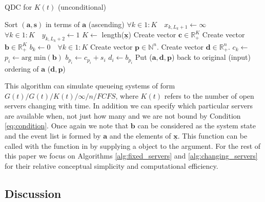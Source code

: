 \documentclass[article]{jss}
\begin{document}
\begin{algorithm}[ht!]
\caption{QDC for $K(t)$ (unconditional)}
\label{alg:changing_servers_unconditional} 
\begin{algorithmic}[1]
\State Sort $(\mathbf{a}, \mathbf{s})$ in terms of $\mathbf{a}$ (ascending)
\State $\forall k \in 1:K \quad x_{k,L_k+1} \leftarrow \infty$
\State $\forall k \in 1:K \quad y_{k,L_k+2} \leftarrow 1$
\State $K \leftarrow $ length($\mathbf{\underline{x}}$)
\State Create vector $\mathbf{c} \in \mathbb{R}_{\text{+}}^{K}$
\State Create vector $\mathbf{b} \in \mathbb{R}_{\text{+}}^{K}$
\State $b_k \leftarrow 0 \quad \forall k \in 1:K$
\State Create vector $\mathbf{p} \in \mathbb{N}^{n}$.
\State Create vector $\mathbf{d} \in \mathbb{R}_{+}^{n}$.
        \State $c_k \leftarrow$ 
    \EndFor
\State $p_i \leftarrow \text{arg min}(\mathbf{b}) $
\State $b_{p_i} \leftarrow c_{p_i} + s_i $
\State $d_i \leftarrow b_{p_i}$ 
\EndFor 
\State Put ($\mathbf{a}, \mathbf{d}, \mathbf{p}$) back to original (input) ordering of $\mathbf{a}$ 
\State \Return ($\mathbf{d}, \mathbf{p}$)
\EndFunction
\end{algorithmic}
\end{algorithm}

This algorithm can simulate queueing systems of form $G(t)/G(t)/K(t)/\infty/n/FCFS$, where $K(t)$ refers to the number of open servers changing with time. In addition we can specify which particular servers are available when, not just how many and we are not bound by Condition \ref{eq:condition}. Once again we note that $\mathbf{b}$ can be considered as the system state and the event list is formed by $\mathbf{a}$ and the elements of $\mathbf{\underline{x}}$. This function can be called with the  function in  by supplying a  object to the  argument. For the rest of this paper we focus on Algorithms \ref{alg:fixed_servers} and \ref{alg:changing_servers} for their relative conceptual simplicity and computational efficiency.

\subsection{Discussion}
\end{document}
